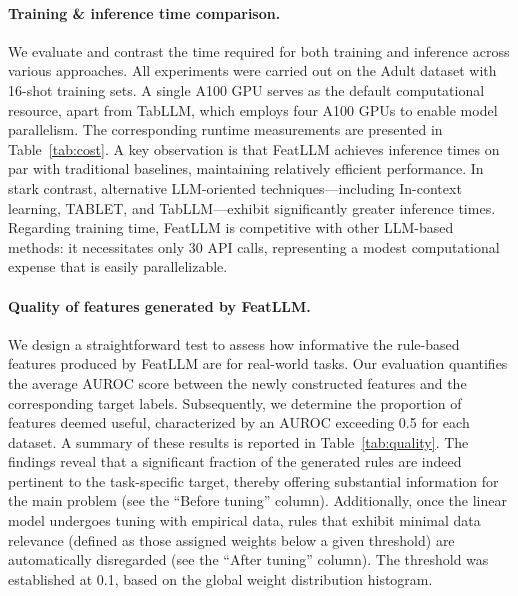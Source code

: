 \vspace*{-0.12in}
\paragraph{Training \& inference time comparison.} We evaluate and contrast the time required for both training and inference across various approaches. All experiments were carried out on the Adult dataset with 16-shot training sets. A single A100 GPU serves as the default computational resource, apart from TabLLM, which employs four A100 GPUs to enable model parallelism. The corresponding runtime measurements are presented in Table~\ref{tab:cost}. A key observation is that \textsf{FeatLLM} achieves inference times on par with traditional baselines, maintaining relatively efficient performance. In stark contrast, alternative LLM-oriented techniques—including In-context learning, TABLET, and TabLLM—exhibit significantly greater inference times. Regarding training time, \textsf{FeatLLM} is competitive with other LLM-based methods: it necessitates only 30 API calls, representing a modest computational expense that is easily parallelizable.

\vspace*{-0.12in}
\paragraph{Quality of features generated by \textsf{FeatLLM}.}
We design a straightforward test to assess how informative the rule-based features produced by \textsf{FeatLLM} are for real-world tasks. Our evaluation quantifies the average AUROC score between the newly constructed features and the corresponding target labels. Subsequently, we determine the proportion of features deemed useful, characterized by an AUROC exceeding 0.5 for each dataset. 
A summary of these results is reported in Table~\ref{tab:quality}. The findings reveal that a significant fraction of the generated rules are indeed pertinent to the task-specific target, thereby offering substantial information for the main problem (see the “Before tuning” column). Additionally, once the linear model undergoes tuning with empirical data, rules that exhibit minimal data relevance (defined as those assigned weights below a given threshold) are automatically disregarded (see the “After tuning” column). The threshold was established at 0.1, based on the global weight distribution histogram.

\vspace*{-0.12in}
